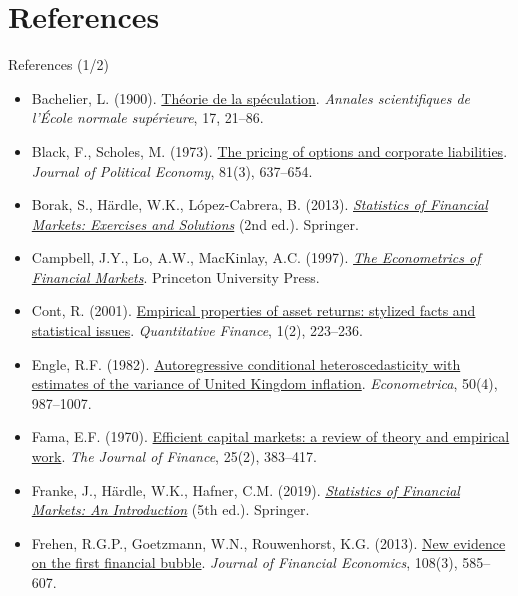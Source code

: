 \section{References}

\begin{frame}{References (1/2)}
\itemsize{\tiny}
\begin{itemize}
    \item Bachelier, L. (1900). \href{https://doi.org/10.24033/asens.476}{Théorie de la spéculation}. \emph{Annales scientifiques de l'École normale supérieure}, 17, 21--86.
    \item Black, F., Scholes, M. (1973). \href{https://doi.org/10.1086/260062}{The pricing of options and corporate liabilities}. \emph{Journal of Political Economy}, 81(3), 637--654.
    \item Borak, S., Härdle, W.K., López-Cabrera, B. (2013). \href{https://doi.org/10.1007/978-3-642-33929-5}{\emph{Statistics of Financial Markets: Exercises and Solutions}} (2nd ed.). Springer.
    \item Campbell, J.Y., Lo, A.W., MacKinlay, A.C. (1997). \href{https://doi.org/10.1515/9781400830213}{\emph{The Econometrics of Financial Markets}}. Princeton University Press.
    \item Cont, R. (2001). \href{https://doi.org/10.1080/713665670}{Empirical properties of asset returns: stylized facts and statistical issues}. \emph{Quantitative Finance}, 1(2), 223--236.
    \item Engle, R.F. (1982). \href{https://doi.org/10.2307/1912773}{Autoregressive conditional heteroscedasticity with estimates of the variance of United Kingdom inflation}. \emph{Econometrica}, 50(4), 987--1007.
    \item Fama, E.F. (1970). \href{https://doi.org/10.2307/2325486}{Efficient capital markets: a review of theory and empirical work}. \emph{The Journal of Finance}, 25(2), 383--417.
    \item Franke, J., Härdle, W.K., Hafner, C.M. (2019). \href{https://doi.org/10.1007/978-3-030-13751-9}{\emph{Statistics of Financial Markets: An Introduction}} (5th ed.). Springer.
    \item Frehen, R.G.P., Goetzmann, W.N., Rouwenhorst, K.G. (2013). \href{https://doi.org/10.1016/j.jfineco.2012.12.008}{New evidence on the first financial bubble}. \emph{Journal of Financial Economics}, 108(3), 585--607.

\end{itemize}
\end{frame}
